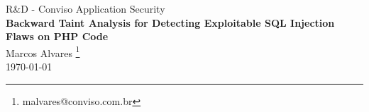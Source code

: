 \begin{center}

R\&D - Conviso Application Security\\[0.5cm]
{\large \textbf{Backward Taint Analysis for Detecting Exploitable SQL Injection Flaws on PHP Code} }\\[0.5cm]

Marcos Alvares \footnote{malvares@conviso.com.br}\\[0.2cm]

\today

\end{center}
